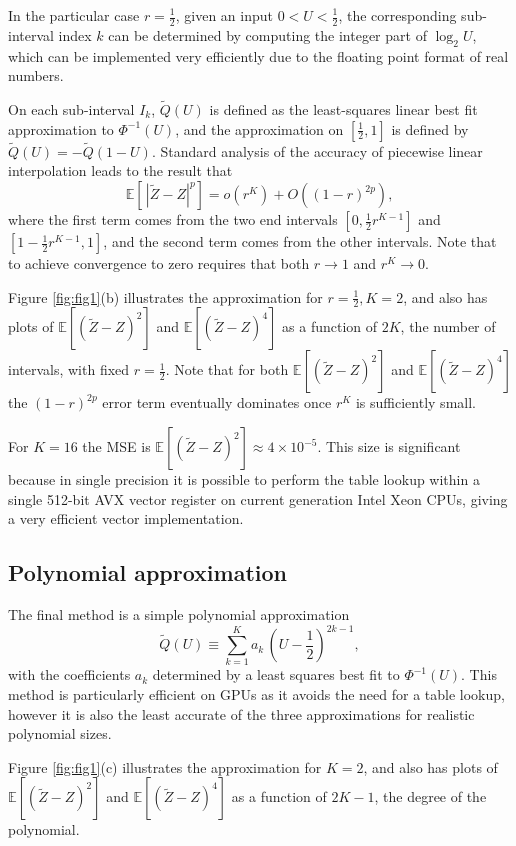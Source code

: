 \documentclass[11pt]{article}
\def \EE {{\mathbb{E}}}
\def \tQ {{\widetilde{Q}}}
\def \tZ {{\widetilde{Z}}}
\newcommand{\fracs}[2]{{\textstyle \frac{#1}{#2}}}
\begin{document}
In the particular case $r\!=\!\fracs{1}{2}$, given an input $0\!<\!U\!<\!\fracs{1}{2}$, 
the corresponding sub-interval index $k$ can be determined by computing the integer 
part of $\log_2U$, which can be implemented very efficiently due to the floating 
point format of real numbers.

On each sub-interval $I_k$, $\tQ(U)$ is defined as the least-squares linear best 
fit approximation to $\Phi^{-1}(U)$, and the approximation on $[\fracs{1}{2},1]$ 
is defined by $\tQ(U) = - \tQ(1{-}U)$.  Standard analysis of the accuracy of
piecewise linear interpolation leads to the result that
\[
\EE[\, |\tZ{-}Z|^p] = o(r^K) + O( (1{-}r)^{2p}),
\]
where the first term comes from the two end intervals $[0,\fracs{1}{2} r^{K-1}]$ 
and $[1{-}\fracs{1}{2} r^{K-1}, 1]$, and the second term comes from the other intervals.
Note that to achieve convergence to zero requires that both $r\rightarrow 1$
and $r^K\rightarrow 0$.

Figure \ref{fig:fig1}(b) illustrates the approximation for 
$r\!=\!\fracs{1}{2} , K\!=\!2$, 
and also has plots of $\EE[(\tZ{-}Z)^2]$ and $\EE[(\tZ{-}Z)^4]$ 
as a function of $2K$,  the number of intervals, with fixed
$r\!=\!\fracs{1}{2}$.  Note that for both $\EE[(\tZ{-}Z)^2]$
and $\EE[(\tZ{-}Z)^4]$ the $(1{-}r)^{2p}$ error term eventually
dominates once $r^K$ is sufficiently small.

For $K\!=\!16$ the MSE is
$\EE[(\tZ{-}Z)^2]\!\approx\! 4\!\times\! 10^{-5}$.
This size is significant because in single precision it is possible to 
perform the table lookup within a single 512-bit AVX vector register on 
current generation Intel Xeon CPUs, giving a very efficient vector 
implementation.

\subsection{Polynomial approximation}

The final method is a simple polynomial approximation
\[
\tQ(U) \equiv \sum_{k=1}^K a_k\, (U{-}\fracs{1}{2})^{2k-1},
\]
with the coefficients $a_k$ determined by a least squares best fit 
to $\Phi^{-1}(U)$.  This method is particularly efficient on GPUs 
as it avoids the need for a table lookup, however it is also the 
least accurate of the three approximations for realistic polynomial sizes.

Figure \ref{fig:fig1}(c) illustrates the approximation for $K\!=\!2$, 
and also has plots of $\EE[(\tZ{-}Z)^2]$ and $\EE[(\tZ{-}Z)^4]$ 
as a function of $2K{-}1$, the degree of the polynomial.
\end{document}
